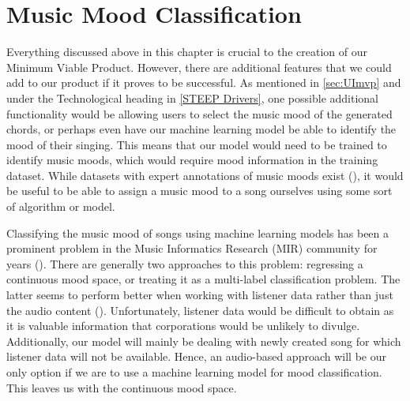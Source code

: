 \section{Music Mood Classification}
\label{Music Mood Classification}
Everything discussed above in this chapter is crucial to the creation of our Minimum Viable Product. However, there are additional features that we could add to our product if it proves to be successful. As mentioned in \cref{sec:UImvp} and under the Technological heading in \cref{STEEP Drivers}, one possible additional functionality would be allowing users to select the music mood of the generated chords, or perhaps even have our machine learning model be able to identify the mood of their singing. This means that our model would need to be trained to identify music moods, which would require mood information in the training dataset. While datasets with expert annotations of music moods exist (\cite{allmusic}), it would be useful to be able to assign a music mood to a song ourselves using some sort of algorithm or model.



Classifying the music mood of songs using machine learning models has been a prominent problem in the Music Informatics Research (MIR) community for years (\cite{MIRMood}). There are generally two approaches to this problem: regressing a continuous mood space, or treating it as a multi-label classification problem. The latter seems to perform better when working with listener data rather than just the audio content (\cite{ListeningData}). Unfortunately, listener data would be difficult to obtain as it is valuable information that corporations would be unlikely to divulge. Additionally, our model will mainly be dealing with newly created song for which listener data will not be available. Hence, an audio-based approach will be our only option if we are to use a machine learning model for mood classification. This leaves us with the continuous mood space.


